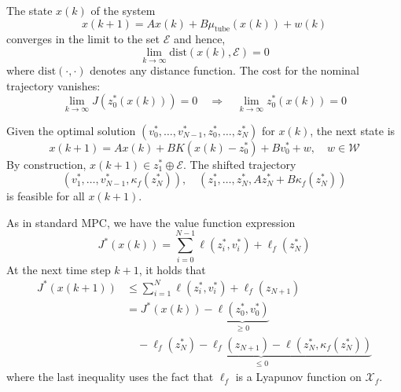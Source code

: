 The state $x(k)$ of the system
\begin{equation*}
    x(k + 1) = A x(k) + B \mu_{\text{tube}}(x(k)) + w(k)
\end{equation*}
converges in the limit to the set $\mathcal{E}$ and hence,
\begin{equation*}
    \lim_{k \to \infty} \text{dist}(x(k), \mathcal{E}) = 0
\end{equation*}
where $\text{dist}(\cdot, \cdot)$ denotes any distance function.
\newpar{}
The cost for the nominal trajectory vanishes:
\begin{equation*}
    \lim_{k \to \infty} J(z_0^*(x(k))) = 0 \quad \Rightarrow \quad \lim_{k \to \infty} z_0^*(x(k)) = 0
\end{equation*}

\begin{examplesection}
    \newpar{}

    Given the optimal solution $\left( v_0^*, \dots, v_{N-1}^*, z_0^*, \dots, z_N^* \right)$ for $x(k)$, the next state is
    \begin{equation*}
        x(k + 1) = A x(k) + B K(x(k) - z_0^*) + B v_0^* + w, \quad w \in \mathcal{W}
    \end{equation*}
    By construction, $x(k + 1) \in z_1^* \oplus \mathcal{E}$. The shifted trajectory
    \begin{equation*}
        \left( v_1^*, \dots, v_{N-1}^*, \kappa_f(z_N^*) \right), \quad \left( z_1^*, \dots, z_N^*, A z_N^* + B \kappa_f(z_N^*) \right)
    \end{equation*}
    is feasible for all $x(k+1)$.

    \newpar{}

    As in standard MPC, we have the value function expression
    \begin{equation*}
        J^*(x(k)) = \sum_{i=0}^{N-1} \ell(z_i^*, v_i^*) + \ell_f(z_N^*)
    \end{equation*}
    At the next time step $k + 1$, it holds that
    \begin{align*}
        J^*(x(k + 1)) & \leq \sum_{i=1}^{N} \ell(z_i^*, v_i^*) + \ell_f(z_{N+1})                                     \\
                      & = J^*(x(k)) - \underbrace{\ell(z_0^*, v_0^*)}_{\geq 0}                                       \\
                      & \quad - \underbrace{\ell_f(z_N^*) - \ell_f(z_{N+1}) - \ell(z_N^*, \kappa_f(z_N^*))}_{\leq 0}
    \end{align*}
    where the last inequality uses the fact that $\ell_f$ is a Lyapunov function on $\mathcal{X}_f$.
\end{examplesection}


